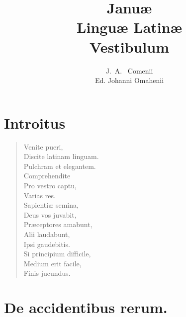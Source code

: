 \documentclass[12pt,  postvopaper]{memoir}
\author{J.~A.~ Comenii\\
\small{Ed. Johanni Omahenii}}
\title{Januæ\\
Linguæ Latinæ\\
Vestibulum}
\begin{document}
\maketitle

\chapter{Introitus}
\begin{verse}

  Venite pueri,\\
  Discite latinam linguam.\\
  Pulchram et elegantem.\\
  Comprehendite\\
  Pro vestro captu,\\
  Varias res.\\
  Sapientiæ semina,\\
  Deus vos juvabit,\\
  Præceptores amabunt,\\
  Alii laudabunt,\\
  Ipsi gaudebitis.\\
  Si principium difficile,\\
  Medium erit facile,\\
  Finis jucundus.\\
\end{verse}


\chapter{De accidentibus rerum.}
\end{document}
